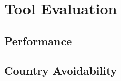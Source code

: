 \section{Tool Evaluation}
\label{evaluation}

\subsection{Performance}

\subsection{Country Avoidability}
